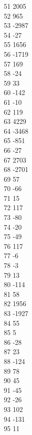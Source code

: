 { 51	2005 \\
 52	965 \\
 53	-2987 \\
 54	-27 \\
 55	1656 \\
 56	-1719 \\
 57	169 \\
 58	-24 \\
 59	33 \\
 60	-142 \\
 61	-10 \\
 62	119 \\
 63	4229 \\
 64	-3468 \\
 65	-851 \\
 66	-27 \\
 67	2703 \\
 68	-2701 \\
 69	57 \\
 70	-66 \\
 71	15 \\
 72	117 \\
 73	-80 \\
 74	-20 \\
 75	-49 \\
 76	117 \\
 77	-6 \\
 78	-3 \\
 79	13 \\
 80	-114 \\
 81	58 \\
 82	1956 \\
 83	-1927 \\
 84	55 \\
 85	5 \\
 86	-28 \\
 87	23 \\
 88	-124 \\
 89	78 \\
 90	45 \\
 91	-45 \\
 92	-26 \\
 93	102 \\
 94	-131 \\
 95	11 \\
}
